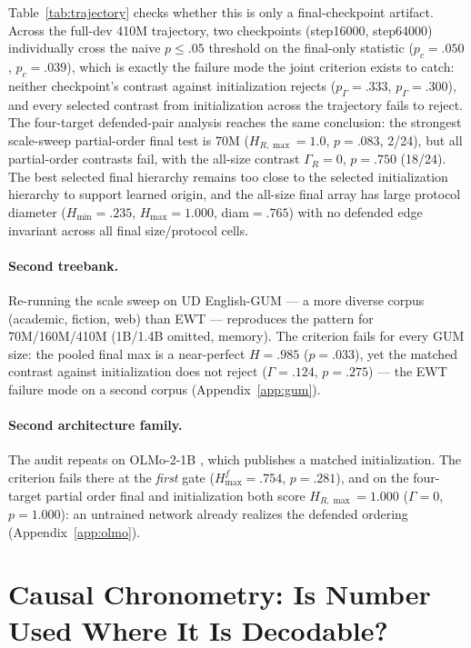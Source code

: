 \documentclass[11pt]{article}
\begin{document}
Table~\ref{tab:trajectory} checks whether this is only a final-checkpoint artifact. Across the full-dev 410M trajectory, two checkpoints (step16000, step64000) individually cross the naive $p\le.05$ threshold on the final-only statistic ($p_c=.050$, $p_c=.039$), which is exactly the failure mode the joint criterion exists to catch: neither checkpoint's contrast against initialization rejects ($p_\Gamma=.333$, $p_\Gamma=.300$), and every selected contrast from initialization across the trajectory fails to reject. The four-target defended-pair analysis reaches the same conclusion: the strongest scale-sweep partial-order final test is 70M ($H_{R,\max}=1.0$, $p=.083$, 2/24), but all partial-order contrasts fail, with the all-size contrast $\Gamma_R=0$, $p=.750$ (18/24). The best selected final hierarchy remains too close to the selected initialization hierarchy to support learned origin, and the all-size final array has large protocol diameter ($H_{\min}=.235$, $H_{\max}=1.000$, diam$=.765$) with no defended edge invariant across all final size/protocol cells.

\paragraph{Second treebank.} Re-running the scale sweep on UD English-GUM --- a more diverse corpus (academic, fiction, web) than EWT --- reproduces the pattern for 70M/160M/410M (1B/1.4B omitted, memory). The criterion fails for every GUM size: the pooled final max is a near-perfect $H=.985$ ($p=.033$), yet the matched contrast against initialization does not reject ($\Gamma=.124$, $p=.275$) --- the EWT failure mode on a second corpus (Appendix~\ref{app:gum}).

\paragraph{Second architecture family.} The audit repeats on OLMo-2-1B \citep{olmo2024olmo2}, which publishes a matched initialization. The criterion fails there at the \emph{first} gate ($H^f_{\max}=.754$, $p=.281$), and on the four-target partial order final and initialization both score $H_{R,\max}=1.000$ ($\Gamma=0$, $p=1.000$): an untrained network already realizes the defended ordering (Appendix~\ref{app:olmo}).

\section{Causal Chronometry: Is Number Used Where It Is Decodable?}
\label{sec:causal}
\end{document}

